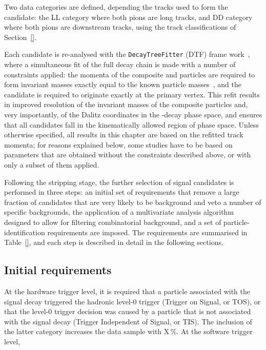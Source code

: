 Two data categories are defined, depending the tracks used to form the \KS candidate: the LL category where both pions are long tracks, and DD category where both pions are downstream tracks, using the track classifications of Section~\ref{}.


Each candidate is re-analysed with the \texttt{DecayTreeFitter} (DTF) frame work~\cite{DTF}, where a simultaneous fit of the full decay chain is made with a number of constraints applied: the momenta of the composite \D and \KS particles are required to form invariant masses exactly equal to the known particle masses~\cite{PDG2020}, and the \B candidate is required to originate exactly at the primary vertex. This refit results in improved resolution of the invariant masses of the composite particles and, very importantly, of the Dalitz coordinates in the \D-decay phase space, and ensures that all candidates fall in the kinematically allowed region of phase space. Unless otherwise specified, all results in this chapter are based on the refitted track momenta; for reasons explained below, some studies have to be based on parameters that are obtained without the constraints described above, or with only a subset of them applied.



Following the stripping stage, the further selection of signal candidates is performed in three steps: an initial set of requirements that remove a large fraction of candidates that are very likely to be background and veto a number of specific backgrounds, the application of a multivariate analysis algorithm designed to allow for filtering combinatorial background, and a set of particle-identification requirements are imposed. The requirements are summarised in Table~\ref{}, and each step is described in detail in the following sections.

\subsection{Initial requirements} %
\label{sub:initial_requirements}

At the hardware trigger level, it is required that a particle associated with the signal decay triggered the hadronic level-0 trigger (Trigger on Signal, or TOS), or that the level-0 trigger decision was caused by a particle that is not associated with the signal decay (Trigger Independent of Signal, or TIS). The inclusion of the latter category increases the data sample with X\,\%. At the software trigger level, 

